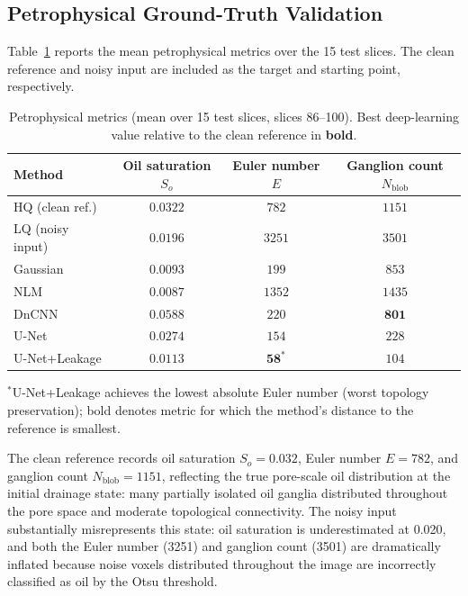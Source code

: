 \documentclass[review,12pt]{elsarticle}
\begin{document}
\subsection{Petrophysical Ground-Truth Validation}
\label{sec:results:physics}

Table~\ref{tab:physics} reports the mean petrophysical metrics over the
15 test slices.  The clean reference and noisy input are included as
the target and starting point, respectively.

\begin{table}[ht]
\centering
\caption{Petrophysical metrics (mean over 15 test slices, slices 86--100).
         Best deep-learning value relative to the clean reference in
         \textbf{bold}.}
\label{tab:physics}
\small
\setlength{\tabcolsep}{4pt}
\begin{tabular}{@{}lccc@{}}
\toprule
Method             & Oil saturation $S_o$  & Euler number $E$  & Ganglion count $N_{\mathrm{blob}}$ \\
\midrule
HQ (clean ref.)    & $0.0322$              & $782$             & $1151$                             \\
LQ (noisy input)   & $0.0196$              & $3251$            & $3501$                             \\
\midrule
Gaussian           & $0.0093$              & $199$             & $853$                              \\
NLM                & $0.0087$              & $1352$            & $1435$                             \\
DnCNN              & $0.0588$              & $220$             & $\mathbf{801}$                     \\
U-Net              & $\mathbf{0.0274}$     & $154$             & $228$                              \\
U-Net+Leakage      & $0.0113$              & $\mathbf{58}^{*}$ & $104$                              \\
\bottomrule
\end{tabular}

\vspace{2pt}
\parbox{\textwidth}{\footnotesize $^{*}$U-Net+Leakage achieves the lowest
absolute Euler number (worst topology preservation); bold denotes metric
for which the method's distance to the reference is smallest.}
\end{table}

The clean reference records oil saturation $S_o = 0.032$, Euler number
$E = 782$, and ganglion count $N_{\mathrm{blob}} = 1151$, reflecting the
true pore-scale oil distribution at the initial drainage state: many
partially isolated oil ganglia distributed throughout the pore space and
moderate topological connectivity.  The noisy input substantially
misrepresents this state: oil saturation is underestimated at 0.020, and
both the Euler number (3251) and ganglion count (3501) are dramatically
inflated because noise voxels distributed throughout the image are
incorrectly classified as oil by the Otsu threshold.
\end{document}
